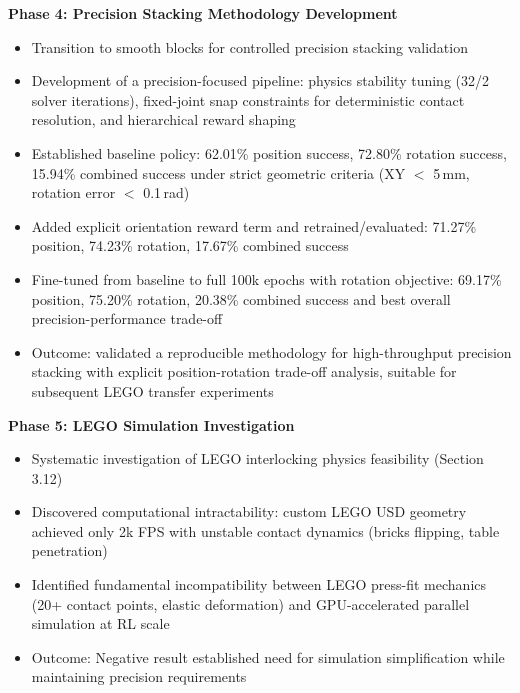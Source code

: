 \documentclass[12pt,a4paper,oneside]{report}
\begin{document}
\textbf{Phase 4: Precision Stacking Methodology Development}
\begin{itemize}
    \item Transition to smooth blocks for controlled precision stacking validation
    \item Development of a precision-focused pipeline: physics stability tuning (32/2 solver iterations), fixed-joint snap constraints for deterministic contact resolution, and hierarchical reward shaping
    \item Established baseline policy: 62.01\% position success, 72.80\% rotation success, 15.94\% combined success under strict geometric criteria (XY $<$ 5\,mm, rotation error $<$ 0.1\,rad)
    \item Added explicit orientation reward term and retrained/evaluated: 71.27\% position, 74.23\% rotation, 17.67\% combined success
    \item Fine-tuned from baseline to full 100k epochs with rotation objective: 69.17\% position, 75.20\% rotation, 20.38\% combined success and best overall precision-performance trade-off
    \item Outcome: validated a reproducible methodology for high-throughput precision stacking with explicit position-rotation trade-off analysis, suitable for subsequent LEGO transfer experiments
\end{itemize}

\textbf{Phase 5: LEGO Simulation Investigation}
\begin{itemize}
    \item Systematic investigation of LEGO interlocking physics feasibility (Section 3.12)
    \item Discovered computational intractability: custom LEGO USD geometry achieved only 2k FPS with unstable contact dynamics (bricks flipping, table penetration)
    \item Identified fundamental incompatibility between LEGO press-fit mechanics (20+ contact points, elastic deformation) and GPU-accelerated parallel simulation at RL scale
    \item Outcome: Negative result established need for simulation simplification while maintaining precision requirements
\end{itemize}
\end{document}
